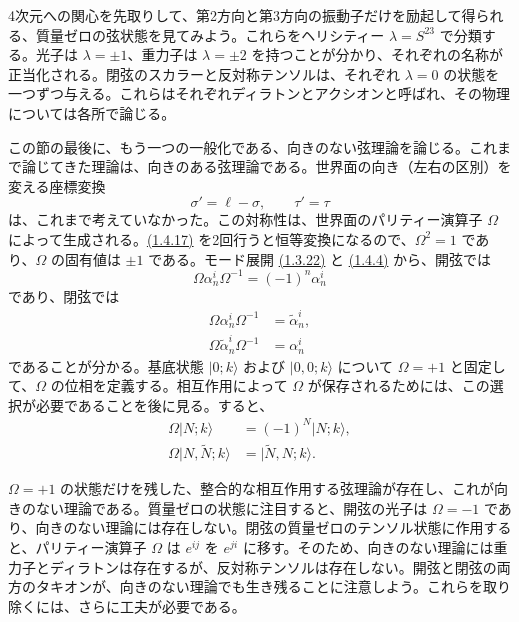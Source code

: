 4次元への関心を先取りして、第2方向と第3方向の振動子だけを励起して得られる、質量ゼロの弦状態を見てみよう。これらをヘリシティー $\lambda=S^{23}$ で分類する。光子は $\lambda=\pm1$、重力子は $\lambda=\pm2$ を持つことが分かり、それぞれの名称が正当化される。閉弦のスカラーと反対称テンソルは、それぞれ $\lambda=0$ の状態を一つずつ与える。これらはそれぞれディラトンとアクシオンと呼ばれ、その物理については各所で論じる。

この節の最後に、もう一つの一般化である、向きのない弦理論を論じる。これまで論じてきた理論は、向きのある弦理論である。世界面の向き（左右の区別）を変える座標変換
\begin{equation}
\sigma'=\ell-\sigma,\qquad\tau'=\tau
\tag{1.4.17}\label{eq:1.4.17}
\end{equation}
は、これまで考えていなかった。この対称性は、世界面のパリティー演算子 $\Omega$ によって生成される。\hyperref[eq:1.4.17]{(1.4.17)} を2回行うと恒等変換になるので、$\Omega^2=1$ であり、$\Omega$ の固有値は $\pm1$ である。モード展開 \hyperref[eq:1.3.22]{(1.3.22)} と \hyperref[eq:1.4.4]{(1.4.4)} から、開弦では
\begin{equation}
\Omega\alpha_n^i\Omega^{-1}=(-1)^n\alpha_n^i
\tag{1.4.18}\label{eq:1.4.18}
\end{equation}
であり、閉弦では
\begin{align}
\Omega\alpha_n^i\Omega^{-1}&=\widetilde\alpha_n^i,
\tag{1.4.19a}\label{eq:1.4.19a}\\
\Omega\widetilde\alpha_n^i\Omega^{-1}&=\alpha_n^i
\tag{1.4.19b}\label{eq:1.4.19b}
\end{align}
であることが分かる。基底状態 $\lvert0;k\rangle$ および $\lvert0,0;k\rangle$ について $\Omega=+1$ と固定して、$\Omega$ の位相を定義する。相互作用によって $\Omega$ が保存されるためには、この選択が必要であることを後に見る。すると、
\begin{align}
\Omega\lvert N;k\rangle&=(-1)^N\lvert N;k\rangle,
\tag{1.4.20a}\label{eq:1.4.20a}\\
\Omega\lvert N,\widetilde N;k\rangle&=\lvert\widetilde N,N;k\rangle.
\tag{1.4.20b}\label{eq:1.4.20b}
\end{align}

$\Omega=+1$ の状態だけを残した、整合的な相互作用する弦理論が存在し、これが向きのない理論である。質量ゼロの状態に注目すると、開弦の光子は $\Omega=-1$ であり、向きのない理論には存在しない。閉弦の質量ゼロのテンソル状態に作用すると、パリティー演算子 $\Omega$ は $e^{ij}$ を $e^{ji}$ に移す。そのため、向きのない理論には重力子とディラトンは存在するが、反対称テンソルは存在しない。開弦と閉弦の両方のタキオンが、向きのない理論でも生き残ることに注意しよう。これらを取り除くには、さらに工夫が必要である。

